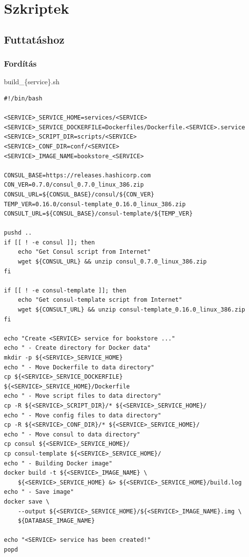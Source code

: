 \documentclass[11pt,magyar,a4paper,twoside,]{report}
\begin{document}
\section{Szkriptek}\label{szkriptek}

\subsection{Futtatáshoz}\label{futtatuxe1shoz}

\subsubsection{\texorpdfstring{Fordítás\label{appendix-build}}{Fordítás}}\label{forduxedtuxe1s}

build\_\{service\}.sh

\begin{verbatim}
#!/bin/bash

<SERVICE>_SERVICE_HOME=services/<SERVICE>
<SERVICE>_SERVICE_DOCKERFILE=Dockerfiles/Dockerfile.<SERVICE>.service
<SERVICE>_SCRIPT_DIR=scripts/<SERVICE>
<SERVICE>_CONF_DIR=conf/<SERVICE>
<SERVICE>_IMAGE_NAME=bookstore_<SERVICE>

CONSUL_BASE=https://releases.hashicorp.com
CON_VER=0.7.0/consul_0.7.0_linux_386.zip
CONSUL_URL=${CONSUL_BASE}/consul/${CON_VER}
TEMP_VER=0.16.0/consul-template_0.16.0_linux_386.zip
CONSULT_URL=${CONSUL_BASE}/consul-template/${TEMP_VER}

pushd ..
if [[ ! -e consul ]]; then
    echo "Get Consul script from Internet"
    wget ${CONSUL_URL} && unzip consul_0.7.0_linux_386.zip
fi

if [[ ! -e consul-template ]]; then
    echo "Get consul-template script from Internet"
    wget ${CONSULT_URL} && unzip consul-template_0.16.0_linux_386.zip
fi

echo "Create <SERVICE> service for bookstore ..."
echo " - Create directory for Docker data"
mkdir -p ${<SERVICE>_SERVICE_HOME}
echo " - Move Dockerfile to data directory"
cp ${<SERVICE>_SERVICE_DOCKERFILE} ${<SERVICE>_SERVICE_HOME}/Dockerfile
echo " - Move script files to data directory"
cp -R ${<SERVICE>_SCRIPT_DIR}/* ${<SERVICE>_SERVICE_HOME}/
echo " - Move config files to data directory"
cp -R ${<SERVICE>_CONF_DIR}/* ${<SERVICE>_SERVICE_HOME}/
echo " - Move consul to data directory"
cp consul ${<SERVICE>_SERVICE_HOME}/
cp consul-template ${<SERVICE>_SERVICE_HOME}/
echo " - Building Docker image"
docker build -t ${<SERVICE>_IMAGE_NAME} \
    ${<SERVICE>_SERVICE_HOME} &> ${<SERVICE>_SERVICE_HOME}/build.log
echo " - Save image"
docker save \
    --output ${<SERVICE>_SERVICE_HOME}/${<SERVICE>_IMAGE_NAME}.img \
    ${DATABASE_IMAGE_NAME}

echo "<SERVICE> service has been created!"
popd
\end{verbatim}
\end{document}
